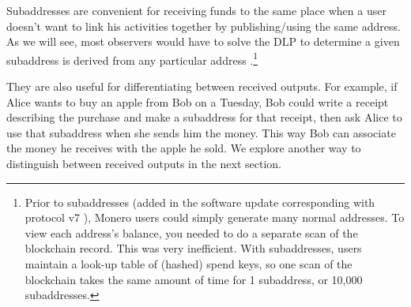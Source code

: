 Subaddresses are convenient for receiving funds to the same place when a user doesn't want to link his activities together by publishing/using the same address. As we will see, most observers would have to solve the DLP to determine a given subaddress is derived from any particular address \cite{MRL-0006-subaddresses}.\footnote{Prior to subaddresses (added in the software update corresponding with protocol v7 \cite{subaddress-pull-request}), Monero users could simply generate many normal addresses. To view each address's balance, you needed to do a separate scan of the blockchain record. This was very inefficient. With subaddresses, users maintain a look-up table of (hashed) spend keys, so one scan of the blockchain takes the same amount of time for 1 subaddress, or 10,000 subaddresses.}

They are also useful for differentiating between received outputs. For example, if Alice wants to buy an apple from Bob on a Tuesday, Bob could write a receipt describing the purchase and make a subaddress for that receipt, then ask Alice to use that subaddress when she sends him the money. This way Bob can associate the money he receives with the apple he sold. We explore another way to distinguish between received outputs in the next section.%


